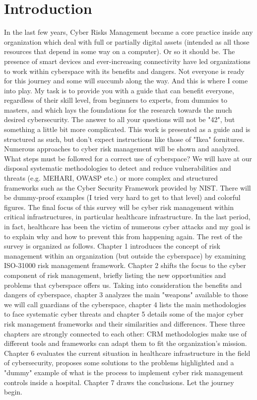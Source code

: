 \chapter*{Introduction}
In the last few years, Cyber Risks Management became a core practice inside any organization which deal with full or partially digital assets (intended as all those resources that depend in some way on a computer). Or so it should be. The presence of smart devices and ever-increasing connectivity have led organizations to work within cyberspace with its benefits and dangers. Not everyone is ready for this journey and some will succumb along the way. And this is where I come into play. My task is to provide you with a guide that can benefit everyone, regardless of their skill level, from beginners to experts, from dummies to masters, and which lays the foundations for the research towards the much desired cybersecurity. The answer to all your questions will not be "42", but something a little bit more complicated. This work is presented as a guide and is structured as such, but don't expect instructions like those of "Ikea" fornitures. Numerous approaches to cyber risk management will be shown and analyzed. What steps must be followed for a correct use of cyberspace? We will have at our disposal systematic methodologies to detect and reduce vulnerabilities and threats (e.g. MEHARI, OWASP etc.) or more complex and structured frameworks such as the Cyber Security Framework provided by NIST. There will be dummy-proof examples (I tried very hard to get to that level) and colorful figures. The final focus of this survey will be cyber risk management within critical infrastructures, in particular healthcare infrastructure. In the last period, in fact, healthcare has been the victim of numerous cyber attacks and my goal is to explain why and how to prevent this from happening again.\newline
The rest of the survey is organized as follows. Chapter 1 introduces the concept of risk management within an organization (but outside the cyberspace) by examining ISO-31000 risk management framework. Chapter 2 shifts the focus to the cyber component of risk management, briefly listing the new opportunities and problems that cyberspace offers us. Taking into consideration the benefits and dangers of cyberspace, chapter 3 analyzes the main "weapons" available to those we will call guardians of the cyberspace, chapter 4 lists the main methodologies to face systematic cyber threats and chapter 5 details some of the major cyber risk management frameworks and their similarities and differences. These three chapters are strongly connected to each other: CRM methodologies make use of different tools and frameworks can adapt them to fit the organization's mission. Chapter 6 evaluates the current situation in healthcare infrastructure in the field of cybersecurity, proposes some solutions to the problems highlighted and a "dummy" example of what is the process to implement cyber risk management controls inside a hospital. Chapter 7 draws the conclusions. Let the journey begin.
